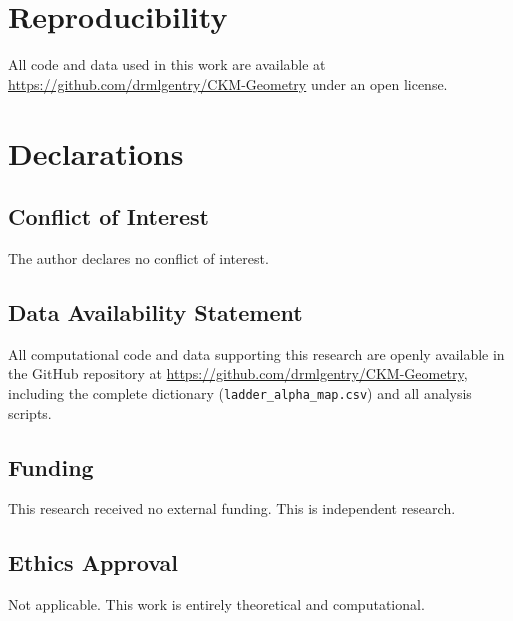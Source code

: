 \documentclass[11pt,a4paper]{article}
\begin{document}
\section*{Reproducibility}

All code and data used in this work are available at \url{https://github.com/drmlgentry/CKM-Geometry} under an open license.

\section*{Declarations}

\subsection*{Conflict of Interest}
The author declares no conflict of interest.

\subsection*{Data Availability Statement}
All computational code and data supporting this research are openly available in the GitHub repository at \url{https://github.com/drmlgentry/CKM-Geometry}, including the complete dictionary (\texttt{ladder\_alpha\_map.csv}) and all analysis scripts.

\subsection*{Funding}
This research received no external funding. This is independent research.

\subsection*{Ethics Approval}
Not applicable. This work is entirely theoretical and computational.
\end{document}
